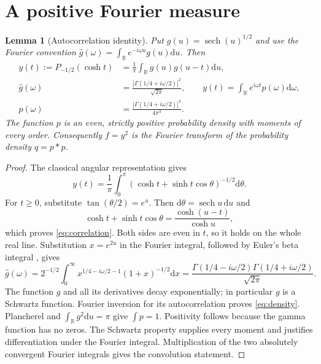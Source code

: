 \documentclass[10pt]{article}
\newtheorem{lemma}[theorem]{Lemma}
\newcommand{\dd}{\mathrm d}
\newcommand{\sech}{\operatorname{sech}}
\begin{document}
\section{A positive Fourier measure}
\begin{lemma}[Autocorrelation identity]
Put $g(u)=\sech(u)^{1/2}$ and use the Fourier convention
$\widehat g(\omega)=\int_{\mathbb R}e^{-i\omega u}g(u)\dd u$. Then
\begin{align}
y(t):=P_{-1/2}(\cosh t)
&=\frac1\pi\int_{\mathbb R}g(u)g(u-t)\dd u,\label{eq:correlation}\\
\widehat g(\omega)&=\frac{|\Gamma(1/4+i\omega/2)|^2}{\sqrt{2\pi}},
\qquad
y(t)=\int_{\mathbb R}e^{i\omega t}p(\omega)\dd\omega,\label{eq:density}\\
p(\omega)&=\frac{|\Gamma(1/4+i\omega/2)|^4}{4\pi^3}.
\end{align}
The function $p$ is an even, strictly positive probability density with
moments of every order. Consequently $f=y^2$ is the Fourier transform of
the probability density $q=p*p$.
\end{lemma}
\begin{proof}
The classical angular representation \cite[Eq.~14.12.7]{dlmf} gives
\[
y(t)=\frac1\pi\int_0^\pi
(\cosh t+\sinh t\cos\theta)^{-1/2}\dd\theta.
\]
For $t\ge0$, substitute $\tan(\theta/2)=e^u$. Then
$\dd\theta=\sech u\,\dd u$ and
\[
\cosh t+\sinh t\cos\theta=\frac{\cosh(u-t)}{\cosh u},
\]
which proves \eqref{eq:correlation}. Both sides are even in $t$, so it
holds on the whole real line. Substitution $x=e^{2u}$ in the Fourier
integral, followed by Euler's beta integral \cite[Eq.~5.12.3]{dlmf}, gives
\[
\widehat g(\omega)=2^{-1/2}
\int_0^\infty x^{1/4-i\omega/2-1}(1+x)^{-1/2}\dd x
=\frac{\Gamma(1/4-i\omega/2)\Gamma(1/4+i\omega/2)}{\sqrt{2\pi}}.
\]
The function $g$ and all its derivatives decay exponentially; in
particular $g$ is a Schwartz function. Fourier inversion for its
autocorrelation proves \eqref{eq:density}. Plancherel and
$\int_{\mathbb R}g^2\dd u=\pi$ give $\int p=1$. Positivity follows
because the gamma function has no zeros. The Schwartz property supplies
every moment and justifies differentiation under the Fourier integral.
Multiplication of the two absolutely convergent Fourier integrals gives
the convolution statement.
\end{proof}
\end{document}

